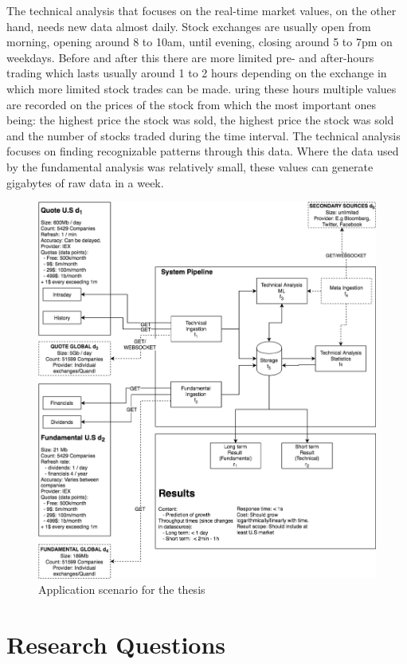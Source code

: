 \documentclass[article,11pt]{article}
\begin{document}
The technical analysis that focuses on the real-time market values, on the other hand, needs new data almost daily.
Stock exchanges are usually open from morning, opening around 8 to 10am, until evening, closing around 5 to 7pm on weekdays.
Before and after this there are more limited pre- and after-hours trading which lasts usually around 1 to 2 hours depending on the exchange in which more limited stock trades can be made.
uring these hours multiple values are recorded on the prices of the stock from which the most important ones being: the highest price the stock was sold, the highest price the stock was sold and the number of stocks traded during the time interval.
The technical analysis focuses on finding recognizable patterns through this data. \cite{murphy}
Where the data used by the fundamental analysis was relatively small, these values can generate gigabytes of raw data in a week.

\begin{figure}[h]
    \includegraphics[scale=0.43]{system2} 
    \centering
    \caption{Application scenario for the thesis}
\end{figure}

\section{Research Questions}
\end{document}

